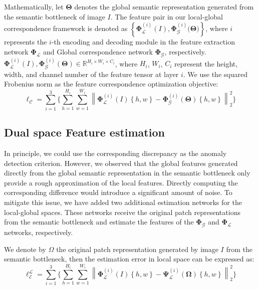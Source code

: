 \documentclass[lettersize,journal]{IEEEtran}
\begin{document}
Mathematically, let $\mathbf{\Theta}$ denotes the global semantic representation generated from the semantic bottleneck of image $I$. The feature pair in our local-global correspondence framework is denoted as $\left \{ \mathbf{\Phi}_{\mathcal{L}}^{(i)}(I),\mathbf{\Phi}_{\mathcal{G}}^{(i)}\mathbf{(\Theta}) \right \}$, where $i$ represents the $i$-th encoding and decoding module in the feature extraction network $\mathbf{\Phi_{\mathcal{L}}}$ and Global correspondence network $\mathbf{\Phi_{\mathcal{G}}}$, respectively.$\mathbf{\Phi}_{\mathcal{L}}^{(i)}(I),\mathbf{\Phi}_{\mathcal{G}}^{(i)}(\mathbf{\Theta})\in \mathbb{R}^{H_{i}\times W_{i}\times C_{i}}$, where $H_{i}$, $W_{i}$, $C_{i}$ represent the height, width, and channel number of the feature tensor at layer $i$. We use the squared Frobenius norm as the feature correspondence optimization objective:
\begin{equation}
\ell_{\mathcal{C} }= \sum_{i=1}^{3}\Big\{   \sum_{h=1}^{H_{i}}  \sum_{w=1}^{W_{i}} \left \|  \mathbf{\Phi}_{\mathcal{L}}^{(i)}(I)\left \{ h,w \right \} -\mathbf{\Phi}_{\mathcal{G}}^{(i)}(\mathbf{\Theta})\left \{ h,w \right \} \right \|_{2}^{2} \Big\} 
\end{equation}

\subsection{Dual space Feature estimation}

In principle, we could use the corresponding discrepancy as the anomaly detection criterion. However, we observed that the global features generated directly from the global semantic representation in the semantic bottleneck only provide a rough approximation of the local features. Directly computing the corresponding difference would introduce a significant amount of noise. To mitigate this issue, we have added two additional estimation networks for the local-global spaces. These networks receive the original patch representations from the semantic bottleneck and estimate the features of the $\mathbf{\Phi_{\mathcal{G}}}$ and $\mathbf{\Phi_{\mathcal{L}}}$ networks, respectively.


We denote by $\Omega$ the original patch representation generated by image $I$ from the semantic bottleneck, then the estimation error in local space can be expressed as:
\begin{equation}
\ell_{\mathcal{E}}^{\mathcal{L}}= \sum_{i=1}^{3}\Big\{   \sum_{h=1}^{H_{i}}  \sum_{w=1}^{W_{i}} \left \|  \mathbf{\Phi}_{\mathcal{L}}^{(i)}(I)\left \{ h,w \right \} -\mathbf{\Psi }_{\mathcal{L}}^{(i)}(\mathbf{\Omega})\left \{ h,w \right \} \right \|_{2}^{2} \Big\} 
\end{equation}
\end{document}
